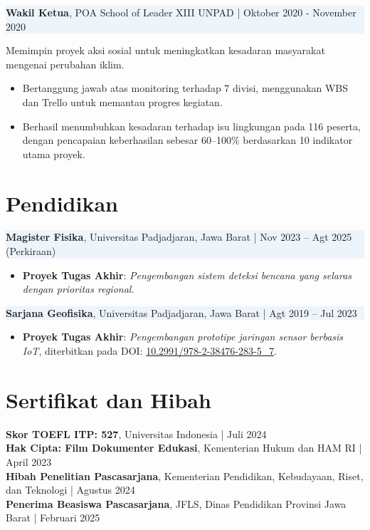 \documentclass[10pt,a4paper]{article}
\begin{document}
\setlength{\fboxsep}{0pt}
\colorbox[HTML]{EDF4FB}{%
  \parbox{\linewidth}{%
    \textbf{Wakil Ketua}, POA School of Leader XIII UNPAD \quad | \quad Oktober 2020 - November 2020%
  }%
}

Memimpin proyek aksi sosial untuk meningkatkan kesadaran masyarakat mengenai perubahan iklim.
\begin{itemize}[left=1.5em, noitemsep, topsep=0pt]
  \item Bertanggung jawab atas monitoring terhadap 7 divisi, menggunakan WBS dan Trello untuk memantau progres kegiatan.
  \item Berhasil menumbuhkan kesadaran terhadap isu lingkungan pada 116 peserta, dengan pencapaian keberhasilan sebesar 60–100\% berdasarkan 10 indikator utama proyek.
\end{itemize}

\section*{Pendidikan}

\setlength{\fboxsep}{0pt}%
\colorbox[HTML]{EDF4FB}{%
  \parbox{\linewidth}{%
    \textbf{Magister Fisika}, Universitas Padjadjaran, Jawa Barat \quad | \quad Nov 2023 – Agt 2025 (Perkiraan)%
  }%
}
\begin{itemize}[left=1.5em, noitemsep, topsep=0pt]
  \item \textbf{Proyek Tugas Akhir}: \textit{Pengembangan sistem deteksi bencana yang selaras dengan prioritas regional.}
\end{itemize}

\setlength{\fboxsep}{0pt}%
\colorbox[HTML]{EDF4FB}{%
  \parbox{\linewidth}{%
    \textbf{Sarjana Geofisika}, Universitas Padjadjaran, Jawa Barat \quad | \quad Agt 2019 – Jul 2023%
  }%
}
{\raggedright\sloppy
\begin{itemize}[left=1.5em, noitemsep, topsep=0pt]
  \item \textbf{Proyek Tugas Akhir}: \textit{Pengembangan prototipe jaringan sensor berbasis IoT}, diterbitkan pada \linebreak DOI: \href{https://doi.org/10.2991/978-2-38476-283-5_7}{10.2991/978-2-38476-283-5\_7}.
\end{itemize}
}

\section*{Sertifikat dan Hibah}

\textbf{Skor TOEFL ITP: 527}, Universitas Indonesia \quad | \quad Juli 2024 \\
\textbf{Hak Cipta: Film Dokumenter Edukasi}, Kementerian Hukum dan HAM RI \quad | \quad April 2023 \\
\textbf{Hibah Penelitian Pascasarjana}, Kementerian Pendidikan, Kebudayaan, Riset, dan Teknologi \quad | \quad Agustus 2024 \\
\textbf{Penerima Beasiswa Pascasarjana}, JFLS, Dinas Pendidikan Provinsi Jawa Barat \quad | \quad Februari 2025
\end{document}

